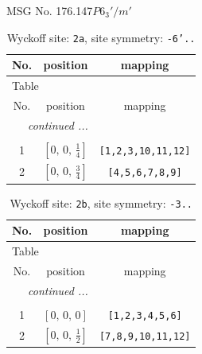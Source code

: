\documentclass[fleqn,8pt]{jsarticle}
\begin{document}
\setcounter{MaxMatrixCols}{32}

\renewcommand{\tablename}{Table~}
\renewcommand{\figurename}{Figure~}
\begin{center}
\LARGE
MSG No. 176.147\quad$P6_{3}'/m'$
\end{center}
\renewcommand{\arraystretch}{1.2}
\begin{longtable}{ccc}
\caption{Wyckoff site: {\tt 2a}, site symmetry: {\tt -6'..}}
 \\
 \hline \hline
No. & position & mapping \\ \hline \endfirsthead

\multicolumn{2}{l}{\tablename\ \thetable{}} \\
 \hline \hline
No. & position & mapping \\ \hline \endhead

 \hline \hline
\multicolumn{2}{r}{\footnotesize\it continued ...} \\ \endfoot

 \hline \hline
\multicolumn{2}{r}{} \\ \endlastfoot

1 & $\left[ 0,\, 0,\, \frac{1}{4} \right]$ & {\tt [1,2,3,10,11,12]} \\ \hline
2 & $\left[ 0,\, 0,\, \frac{3}{4} \right]$ & {\tt [4,5,6,7,8,9]} \\
\end{longtable}
\renewcommand{\arraystretch}{1.2}
\begin{longtable}{ccc}
\caption{Wyckoff site: {\tt 2b}, site symmetry: {\tt -3..}}
 \\
 \hline \hline
No. & position & mapping \\ \hline \endfirsthead

\multicolumn{2}{l}{\tablename\ \thetable{}} \\
 \hline \hline
No. & position & mapping \\ \hline \endhead

 \hline \hline
\multicolumn{2}{r}{\footnotesize\it continued ...} \\ \endfoot

 \hline \hline
\multicolumn{2}{r}{} \\ \endlastfoot

1 & $\left[ 0,\, 0,\, 0 \right]$ & {\tt [1,2,3,4,5,6]} \\ \hline
2 & $\left[ 0,\, 0,\, \frac{1}{2} \right]$ & {\tt [7,8,9,10,11,12]} \\
\end{longtable}
\end{document}
